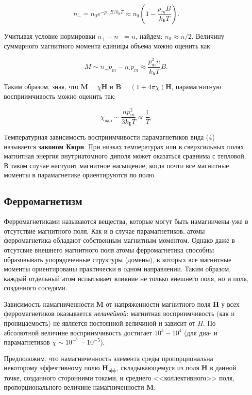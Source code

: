 \documentclass[a4paper,12pt]{article} %
\begin{document}
$$
n_{-} = n_{0}e^{-p_{m}B/k_\text{Б}T} \approx n_{0} \left( 1 - \frac{p_{m}B}{k_\text{Б}T} \right).
$$

\hfill \break Учитывая условие нормировки $n_{+} + n_{-} = n$, найдем: $n_{0} \approx n/2$. Величину суммарного магнитного момента единицы объема можно оценить как

$$
M \sim n_{+}p_{m} - n_\text{-}p_{m} \approx \frac{p_{m}^2n}{k_\text{Б}T}B.
$$

\hfill \break Таким образом, зная, что $\textbf{M} = \chi \textbf{H}$ и $\textbf{B} = (1+4\pi \chi) \textbf{H}$, парамагнитную восприимчивость можно оценить так:

\begin{equation}\label{ linkname }
\chi_\text{пар} \sim \frac{np_{m}^2}{3k_\text{Б}T} \propto \frac{1}{T}.
\end{equation}

\hfill \break Температурная зависимость восприимчивости парамагнетиков вида (4) называется \textbf{законом Кюри}. При низках температурах или в сверхсильных полях магнитная энергия внутриатомного диполя может оказаться сравнима с тепловой. В таком случае наступит магнитное насыщение, когда почти все магнитные моменты в парамагнетике ориентируются по полю.

\subsection{Ферромагнетизм}
\hfill \break Ферромагнетиками называются вещества, которые могут быть намагничены уже в отсутствие магнитного поля. Как и в случае парамагнетиков, атомы ферромагнетика обладают собственным магнитным моментом. Однако даже в отсутсвие внешнего магнитного поля атомы ферромагнетика способны образовывать упорядоченные структуры (домены), в которых все магнитные моменты ориентированы практически в одном направлении. Таким образом, каждый отдельный атом испытывает влияние не только внешнего поля, но и поля, созданного соседями. 

\hfill \break Зависимость намагниченности $\textbf{M}$ от напряженности магнитного поля $\textbf{H}$ у всех ферромагнетиков оказывается \textit{нелинейной}: магнитная восприимчивость (как и проницаемость) не является постоянной величиной и зависит от $H$. По абсолютной величине восприимчивость достигает $10^3 - 10^4$ (для диа- и парамагнетиков $\chi \sim 10^{-7}-10^{-5}$). 

\hfill \break Предположим, что намагниченность элемента среды пропорциональна некоторому эффективному полю $\textbf{H}_\text{эфф}$, складывающемуся из поля $\textbf{H}$ в данной точке, созданного сторонними токами, и среднего <<коллективного>> поля, пропорционального величине намагниченности $\textbf{M}$:
\end{document}
